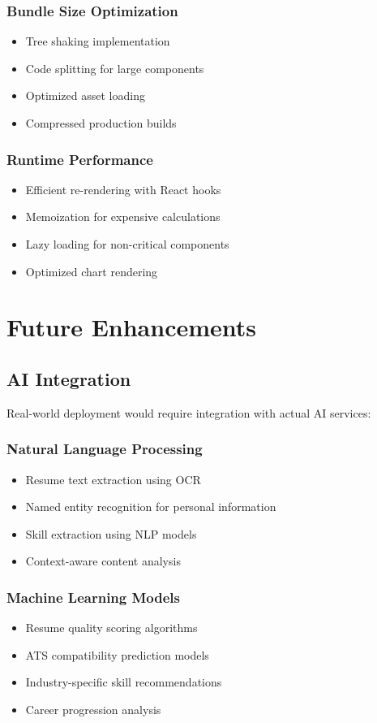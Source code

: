 \documentclass[12pt,a4paper]{article}
\begin{document}
\subsubsection{Bundle Size Optimization}
\begin{itemize}
    \item Tree shaking implementation
    \item Code splitting for large components
    \item Optimized asset loading
    \item Compressed production builds
\end{itemize}

\subsubsection{Runtime Performance}
\begin{itemize}
    \item Efficient re-rendering with React hooks
    \item Memoization for expensive calculations
    \item Lazy loading for non-critical components
    \item Optimized chart rendering
\end{itemize}

\section{Future Enhancements}

\subsection{AI Integration}
Real-world deployment would require integration with actual AI services:

\subsubsection{Natural Language Processing}
\begin{itemize}
    \item Resume text extraction using OCR
    \item Named entity recognition for personal information
    \item Skill extraction using NLP models
    \item Context-aware content analysis
\end{itemize}

\subsubsection{Machine Learning Models}
\begin{itemize}
    \item Resume quality scoring algorithms
    \item ATS compatibility prediction models
    \item Industry-specific skill recommendations
    \item Career progression analysis
\end{itemize}
\end{document}
